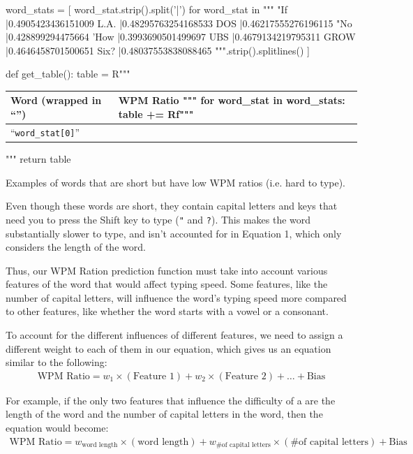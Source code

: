 \documentclass[12pt]{article}
\newcommand{\code}[1]{\texttt{#1}}
\begin{document}
\begin{pycode}
word_stats = [
	word_stat.strip().split('|') for word_stat in """
		"If |0.4905423436151009
		L.A. |0.48295763254168533
		DOS |0.46217555276196115
		"No |0.428899294475664
		'How |0.3993690501499697
		UBS |0.4679134219795311
		GROW |0.4646458701500651
		Six? |0.48037553838088465
	""".strip().splitlines()
]

def get_table():
	table = R"""
		\begin{center}
		\noindent
		\begin{tabularx}{
			0.5\linewidth
		}{|X|X|}
		\hline
		Word (wrapped in ``'') & WPM Ratio
	"""
	for word_stat in word_stats:
		table += Rf"""
			\\\hline
			``\code{{{word_stat[0]}}}'' & {"%
		"""
	table += R"""
		\\\hline
		\end{tabularx}
		\end{center}
	"""
	return table
\end{pycode}

\begin{table}[H]
	\caption{Examples of words that are short but have low WPM ratios (i.e. hard to type).}
\end{table}

Even though these words are short, they contain capital letters and keys that need you to press the Shift key to type (\code{"} and \code{?}). This makes the word substantially slower to type, and isn't accounted for in Equation 1, which only considers the length of the word.

Thus, our WPM Ration prediction function must take into account various features of the word that would affect typing speed. Some features, like the number of capital letters, will influence the word's typing speed more compared to other features, like whether the word starts with a vowel or a consonant.

To account for the different influences of different features, we need to assign a different weight to each of them in our equation, which gives us an equation similar to the following:
\begin{align*}
	\text{WPM Ratio} = w_1 \times (\text{Feature 1}) + w_2 \times (\text{Feature 2}) + \dots + \text{Bias}
\end{align*}

For example, if the only two features that influence the difficulty of a are the length of the word and the number of capital letters in the word, then the equation would become:
\begin{align*}
	\text{WPM Ratio} = w_{\text{word length}} \times (\text{word length}) + w_{\text{\# of capital letters}} \times (\text{\# of capital letters}) + \text{Bias}
\end{align*}
\end{document}
